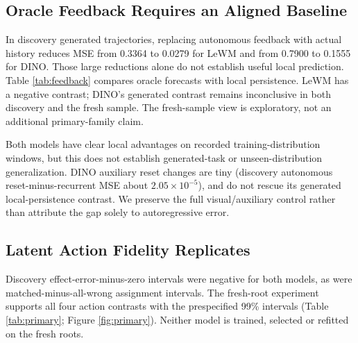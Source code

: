 \subsection{Oracle Feedback Requires an Aligned Baseline}
\label{sec:feedbackresults}
In discovery generated trajectories, replacing autonomous feedback with actual
history reduces MSE from 0.3364 to 0.0279 for LeWM and from 0.7900 to 0.1555
for DINO. Those large reductions alone do not establish useful local prediction.
Table \ref{tab:feedback} compares oracle forecasts with local persistence.
LeWM has a negative contrast; DINO's generated contrast remains inconclusive
in both discovery and the fresh sample. The fresh-sample view is exploratory,
not an additional primary-family claim.

\begin{table}[t]
\caption{Actual-history prediction minus aligned local persistence at horizon
8. Negative favors prediction; intervals are pointwise exploratory 95\%.
Recorded sequences overlap the pretraining distribution.}
\label{tab:feedback}
\centering\small

\end{table}

Both models have clear local advantages on recorded training-distribution
windows, but this does not establish generated-task or unseen-distribution
generalization. DINO auxiliary reset changes are tiny (discovery autonomous
reset-minus-recurrent MSE about $2.05\times10^{-5}$), and do not rescue its
generated local-persistence contrast. We preserve the full visual/auxiliary
control rather than attribute the gap solely to autoregressive error.

\subsection{Latent Action Fidelity Replicates}
\label{sec:replication}
Discovery effect-error-minus-zero intervals were negative for both models,
as were matched-minus-all-wrong assignment intervals. The fresh-root experiment
supports all four action contrasts with the prespecified 99\% intervals
(Table \ref{tab:primary}; Figure \ref{fig:primary}). Neither model is trained,
selected or refitted on the fresh roots.

\begin{table}[t]
\caption{All five primary fresh-root contrasts, original appearance/horizon 8.
Equal-root estimates and two-sided 99\% bootstrap intervals form the fixed
five-member family. Negative directions support the corresponding contrast.
The DINO ranking result is inconclusive, not a successful replication.}
\label{tab:primary}
\centering

\end{table}

